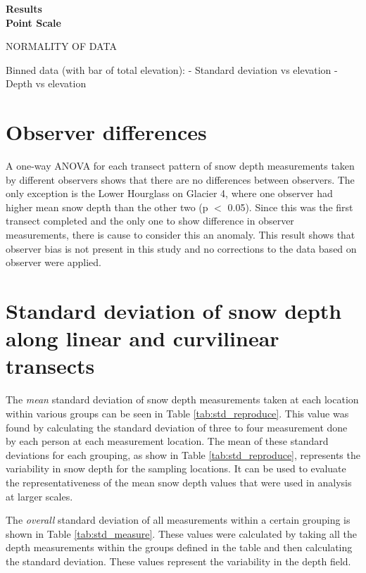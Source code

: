 \documentclass[12pt]{article}
\begin{document}

\begin{center}
\Large \textbf{Results\\ Point Scale}
\end{center}

NORMALITY OF DATA

Binned data (with bar of total elevation):
- Standard deviation vs elevation
- Depth vs elevation





\tableofcontents

\section{Observer differences}

A one-way ANOVA for each transect pattern of snow depth measurements taken by different observers  shows that there are no differences between observers. The only exception is the Lower Hourglass on Glacier 4, where one observer had higher mean snow depth than the other two (p $<$ 0.05). Since this was the first transect completed and the only one to show difference in observer measurements, there is cause to consider this an anomaly. This result shows that observer bias is not present in this study and no corrections to the data based on observer were applied.

\section{Standard deviation of snow depth along linear and curvilinear transects}

The \textit{mean} standard deviation of snow depth measurements taken at each location within various groups can be seen in Table \ref{tab:std_reproduce}. This value was found by calculating the standard deviation of three to four measurement done by each person at each measurement location. The mean of these standard deviations for each grouping, as show in Table  \ref{tab:std_reproduce}, represents the variability in snow depth for the sampling locations. It can be used to evaluate the representativeness of the mean snow depth values that were used in analysis at larger scales.

The \textit{overall} standard deviation of all measurements within a certain grouping is shown in Table \ref{tab:std_measure}. These values were calculated by taking all the depth measurements within the groups defined in the table and then calculating the standard deviation. These values represent the variability in the depth field. 
\end{document}
